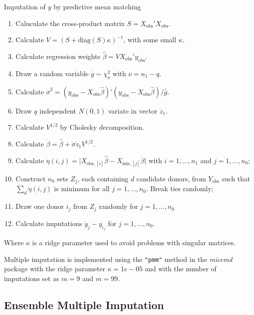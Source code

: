 \documentclass[12pt,]{article}
\begin{document}
\begin{algorithm}[H]
\label{alg:pmm-alg}
\caption{Imputation of $y$ by predictive mean matching}
\DontPrintSemicolon
\SetAlgoLined
\BlankLine

\begin{enumerate}
  \item Caluculate the cross-product matrix $S=X_{\text{obs}}'X_{\text{obs}}$.
  \item Calculate $V = (S + \text{diag}(S)\kappa)^{-1}$, with some small $\kappa$.
  \item Calculate regression weights $\hat{\beta} = V X_{\text{obs}}' y_{\text{obs}}$.
  \item Draw a random variable $\dot{g} \sim \chi^2_{\nu}$ with $\nu = n_1 - q$.
  \item Calculate $\dot{\sigma}^2 = (y_{\text{obs}} - X_{\text{obs}} \hat{\beta})' (y_{\text{obs}} - X_{\text{obs}} \hat{\beta}) / \hat{g}$.
  \item Draw $q$ independent $N(0,1)$ variate in vector $\dot{z}_1$.
  \item Calculate $V^{1/2}$ by Cholesky decomposition.
  \item Calculate $\dot{\beta} = \hat{\beta} + \dot{\sigma} \dot{z}_1 V^{1/2}$.
  \item Calculate $\dot{\eta}(i,j) = \vert X_{\text{obs},[i]} \hat{\beta} - X_{\text{mis},[j]} \dot{\beta} \vert$ with $i=1,...,n_1$ and $j=1,...,n_0$; 
  \item Construct $n_0$ sets $Z_j$, each containing $d$ candidate donors, from $Y_{\text{obs}}$ such that $\sum_d \dot{\eta}(i,j)$ is minimum for all $j=1,...,n_0$.  Break ties randomly;
  \item Draw one donor $i_j$ from $Z_j$ randomly for $j=1,...,n_0$
  \item Calculate imputations $\dot{y}_j - y_{i_j}$ for $j=1,...,n_0$.
\end{enumerate}

\BlankLine
\end{algorithm}

Where \(\kappa\) is a ridge parameter used to avoid problems with
singular matrices.

Multiple imputation is implemented using the \texttt{"pmm"} method in
the \emph{micemd} package with the ridge parameter \(\kappa = 1e-05\)
and with the number of imputations set as \(m=9\) and \(m=99\).

\subsection{Ensemble Multiple
Imputation}\label{ensemble-multiple-imputation}
\end{document}

